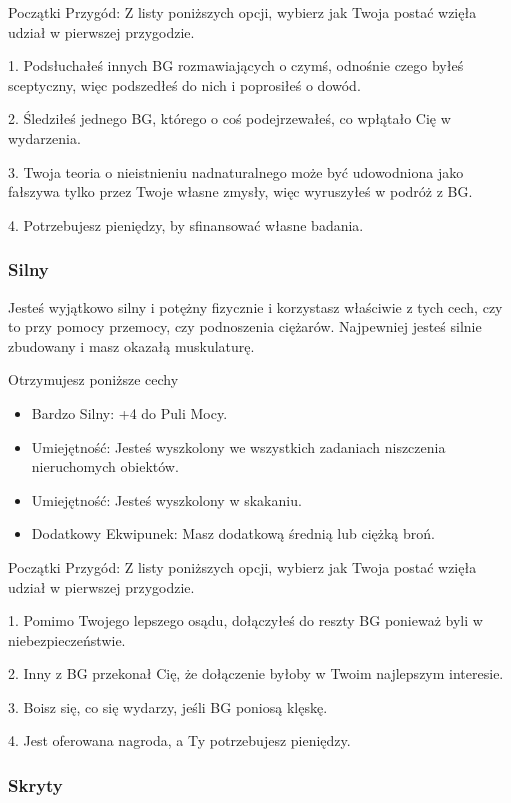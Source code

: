 Początki Przygód: Z listy poniższych opcji, wybierz jak Twoja postać wzięła udział w pierwszej przygodzie.

1. Podsłuchałeś innych BG rozmawiających o czymś, odnośnie czego byłeś sceptyczny, więc podszedłeś do nich i poprosiłeś o dowód.

2. Śledziłeś jednego BG, którego o coś podejrzewałeś, co wpłątało Cię w wydarzenia.

3. Twoja teoria o nieistnieniu nadnaturalnego może być udowodniona jako fałszywa tylko przez Twoje własne zmysły, więc wyruszyłeś w podróż z BG.

4. Potrzebujesz pieniędzy, by sfinansować własne badania.

\subsubsection{Silny}
Jesteś wyjątkowo silny i potężny fizycznie i korzystasz właściwie z tych cech, czy to przy pomocy przemocy, czy podnoszenia ciężarów. Najpewniej jesteś silnie zbudowany i masz okazałą muskulaturę.

Otrzymujesz poniższe cechy
\begin{itemize}
    \item  Bardzo Silny: +4 do Puli Mocy.
    \item  Umiejętność: Jesteś wyszkolony we wszystkich zadaniach niszczenia nieruchomych obiektów.
    \item  Umiejętność: Jesteś wyszkolony w skakaniu.
    \item Dodatkowy Ekwipunek: Masz dodatkową średnią lub ciężką broń.
\end{itemize}

Początki Przygód: Z listy poniższych opcji, wybierz jak Twoja postać wzięła udział w pierwszej przygodzie.

1. Pomimo Twojego lepszego osądu, dołączyłeś do reszty BG ponieważ byli w niebezpieczeństwie.

2. Inny z BG przekonał Cię, że dołączenie byłoby w Twoim najlepszym interesie.

3. Boisz się, co się wydarzy, jeśli BG poniosą klęskę.

4. Jest oferowana nagroda, a Ty potrzebujesz pieniędzy.

\subsubsection{Skryty}

